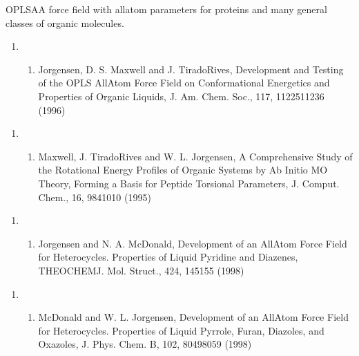 \documentclass[letterpaper,11pt,english]{sphinxmanual}
\begin{document}
OPLS\sphinxhyphen{}AA force field with all\sphinxhyphen{}atom parameters for proteins and many general classes of organic molecules.
\begin{enumerate}
%
\setcounter{enumi}{22}
\item {} \begin{enumerate}
%
\setcounter{enumii}{11}
\item {} 
Jorgensen, D. S. Maxwell and J. Tirado\sphinxhyphen{}Rives, Development and Testing of the OPLS All\sphinxhyphen{}Atom Force Field on Conformational Energetics and Properties of Organic Liquids, J. Am. Chem. Soc., 117, 11225\sphinxhyphen{}11236 (1996)

\end{enumerate}

\end{enumerate}
\begin{enumerate}
%
\setcounter{enumi}{3}
\item {} \begin{enumerate}
%
\setcounter{enumii}{18}
\item {} 
Maxwell, J. Tirado\sphinxhyphen{}Rives and W. L. Jorgensen, A Comprehensive Study of the Rotational Energy Profiles of Organic Systems by Ab Initio MO Theory, Forming a Basis for Peptide Torsional Parameters, J. Comput. Chem., 16, 984\sphinxhyphen{}1010 (1995)

\end{enumerate}

\end{enumerate}
\begin{enumerate}
%
\setcounter{enumi}{22}
\item {} \begin{enumerate}
%
\setcounter{enumii}{11}
\item {} 
Jorgensen and N. A. McDonald, Development of an All\sphinxhyphen{}Atom Force Field for Heterocycles. Properties of Liquid Pyridine and Diazenes, THEOCHEM\sphinxhyphen{}J. Mol. Struct., 424, 145\sphinxhyphen{}155 (1998)

\end{enumerate}

\end{enumerate}
\begin{enumerate}
%
\setcounter{enumi}{13}
\item {} \begin{enumerate}
%
\item {} 
McDonald and W. L. Jorgensen, Development of an All\sphinxhyphen{}Atom Force Field for Heterocycles. Properties of Liquid Pyrrole, Furan, Diazoles, and Oxazoles, J. Phys. Chem. B, 102, 8049\sphinxhyphen{}8059 (1998)

\end{enumerate}

\end{enumerate}
\end{document}
